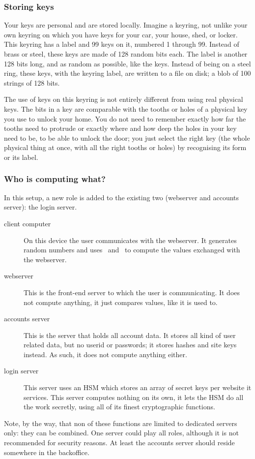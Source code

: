 \subsubsection{Storing keys}
Your keys are personal and are stored locally.
Imagine a keyring,
	not unlike your own keyring on which you have keys for your car,
		your house,
			shed,
				or locker.
This keyring has a label and 99 keys on it,
	numbered 1 through 99.
Instead of brass or steel,
	these keys are made of 128 random bits each.
The label is another 128 bits long,
	and as random as possible,
		like the keys.
Instead of being on a steel ring,
	these keys,
		with the keyring label,
			are written to a file on disk;
				a blob of 100 strings of 128 bits.
\par
The use of keys on this keyring is not entirely different from using real physical keys.
The bits in a key are comparable with the tooths or holes of a physical key you use to unlock your home.
You do not need to remember exactly how far the tooths need to protrude or exactly where and how deep the holes in your key need to be,
	to be able to unlock the door;
		you just select the right key
			(the whole physical thing at once, with all the right tooths or holes)
				by recognising its form or its label.

\subsubsection{Who is computing what?}
In this setup,
a new role is added to the existing two
(webserver and accounts server):
the login server.
\begin{description}
\item[client computer]	On this device the user communicates with the webserver.
	It generates random numbers and uses \XOR\ and \SHA\ to compute the values exchanged with the webserver.
\item[webserver]	This is the front-end server to which the user is communicating.
	It does not compute anything, it just compares values, like it is used to.
\item[accounts server]	This is the server that holds all account data.
		It stores all kind of user related data, but no userid or passwords;
		it stores hashes and site keys instead.
		As such, it does not compute anything either.
\item[login server]	This server uses an HSM which stores an array of secret keys per website it services.
	This server computes nothing on its own,
	it lets the HSM do all the work secretly, using all of its finest cryptographic functions.
\end{description}
Note, by the way, that non of these functions are limited to dedicated servers only:
they can be combined.
One server could play all roles, although it is not recommended for security reasons.
At least the accounts server should reside somewhere in the backoffice.

